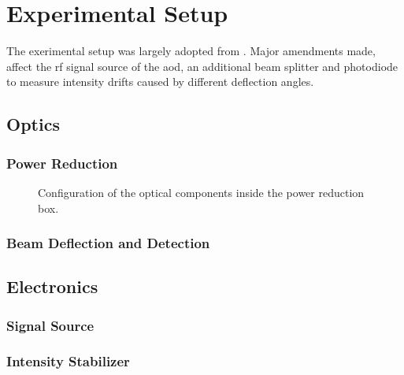 \chapter{Experimental Setup}

The exerimental setup was largely adopted from \cite{Hertlein2017}. Major
amendments made, affect the \gls{rf} signal source of the \gls{aod},
an additional beam splitter and photodiode to measure intensity drifts caused
by different deflection angles.

\section{Optics}

\subsection{Power Reduction}

\begin{figure}[h]
  \centering
  \caption{Configuration of the optical components inside the power reduction box.}
\end{figure}

\subsection{Beam Deflection and Detection}

\section{Electronics}

\subsection{Signal Source}

\subsection{Intensity Stabilizer}

